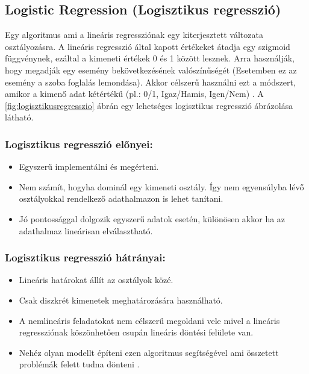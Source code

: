 \subsection{Logistic Regression (Logisztikus regresszió)}
Egy algoritmus ami a lineáris regressziónak egy kiterjesztett változata osztályozásra. A lineáris regresszió által kapott értékeket átadja egy szigmoid függvénynek, ezáltal a kimeneti értékek 0 és 1 között lesznek.   Arra használják, hogy megadják egy esemény bekövetkezésének valószínűségét (Esetemben ez az esemény a szoba foglalás lemondása). Akkor célszerű használni ezt a módszert, amikor a kimenő adat kétértékű (pl.: 0/1, Igaz/Hamis, Igen/Nem) \cite{logisztikus_regresszio_2}. A \ref{fig:logisztikusregresszio} ábrán egy lehetséges logisztikus regresszió ábrázolása látható.

\subsubsection{Logisztikus regresszió előnyei:}
\begin{itemize}
    \item Egyszerű implementálni és megérteni.
    \item Nem számít, hogyha dominál egy kimeneti osztály. Így nem egyensúlyba lévő osztályokkal rendelkező adathalmazon is lehet tanítani.
    \item Jó pontossággal dolgozik egyszerű adatok esetén, különösen akkor ha az adathalmaz lineárisan elválasztható.
\end{itemize}

\subsubsection{Logisztikus regresszió hátrányai:}
\begin{itemize}
    \item Lineáris határokat állít az osztályok közé.
    \item Csak diszkrét kimenetek meghatározására használható.
    \item A nemlineáris feladatokat nem célszerű megoldani vele mivel a lineáris regressziónak köszönhetően csupán lineáris döntési felülete van.
    \item Nehéz olyan modellt építeni ezen algoritmus segítségével ami összetett problémák felett tudna dönteni \cite{logisztikus_regresszio_2}.
\end{itemize}

